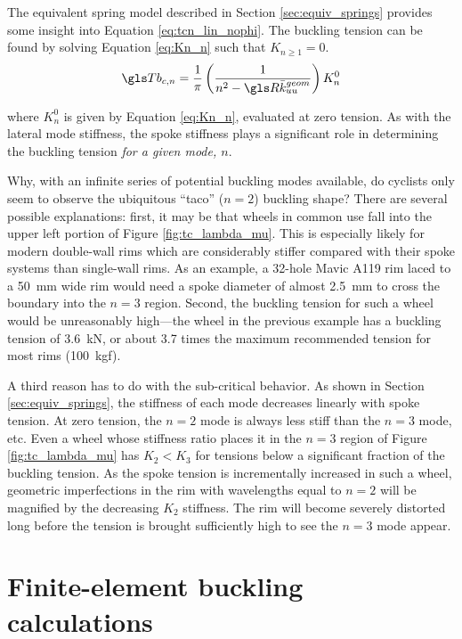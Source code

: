 \documentclass[\rootdir/thesis.tex]{subfiles}
\begin{document}
The equivalent spring model described in Section \ref{sec:equiv_springs} provides some insight into Equation \eqref{eq:tcn_lin_nophi}. The buckling tension can be found by solving Equation \eqref{eq:Kn_n} such that $K_{n\geq 1} = 0$.
\begin{equation}
\Tb_{c,n} = \frac{1}{\pi}\left(\frac{1}{n^2 - \R\geom{\kuu}}\right) K_n^0
\end{equation}

where $K_n^0$ is given by Equation \eqref{eq:Kn_n}, evaluated at zero tension. As with the lateral mode stiffness, the spoke stiffness plays a significant role in determining the buckling tension \emph{for a given mode, $n$}.

Why, with an infinite series of potential buckling modes available, do cyclists only seem to observe the ubiquitous ``taco'' ($n=2$) buckling shape? There are several possible explanations: first, it may be that wheels in common use fall into the upper left portion of Figure \ref{fig:tc_lambda_mu}. This is especially likely for modern double-wall rims which are considerably stiffer compared with their spoke systems than single-wall rims. As an example, a 32-hole Mavic A119 rim laced to a \SI{50}{mm} wide rim would need a spoke diameter of almost \SI{2.5}{mm} to cross the boundary into the $n=3$ region. Second, the buckling tension for such a wheel would be unreasonably high---the wheel in the previous example has a buckling tension of \SI{3.6}{kN}, or about 3.7 times the maximum recommended tension for most rims (\SI{100}{kgf}).

A third reason has to do with the sub-critical behavior. As shown in Section \ref{sec:equiv_springs}, the stiffness of each mode decreases linearly with spoke tension. At zero tension, the $n=2$ mode is always less stiff than the $n=3$ mode, etc. Even a wheel whose stiffness ratio places it in the $n=3$ region of Figure \ref{fig:tc_lambda_mu} has $K_2<K_3$ for tensions below a significant fraction of the buckling tension. As the spoke tension is incrementally increased in such a wheel, geometric imperfections in the rim with wavelengths equal to $n=2$ will be magnified by the decreasing $K_2$ stiffness. The rim will become severely distorted long before the tension is brought sufficiently high to see the $n=3$ mode appear.


\section{Finite-element buckling calculations}
\end{document}
